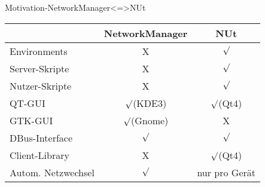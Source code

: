 \begin{frame}[<+-| alert@+>]{Motivation-NetworkManager<=>NUt}
	\begin{tabular}{l|c|c}
								& NetworkManager	& NUt \\
		\hline
		Environments			& X					& $\surd$ \\
		\hline
		Server-Skripte			& X					& $\surd$ \\
		\hline
		Nutzer-Skripte			& X					& $\surd$ \\
		\hline
		QT-GUI					& $\surd$(KDE3)		& $\surd$(Qt4) \\
		\hline
		GTK-GUI					& $\surd$(Gnome)	& X			\\
		\hline
		DBus-Interface			& $\surd$			& $\surd$	\\
		\hline
		Client-Library			& X					& $\surd$(Qt4)	\\
		\hline
		Autom. Netzwechsel		& $\surd$			& nur pro Gerät
	\end{tabular}

\end{frame}
